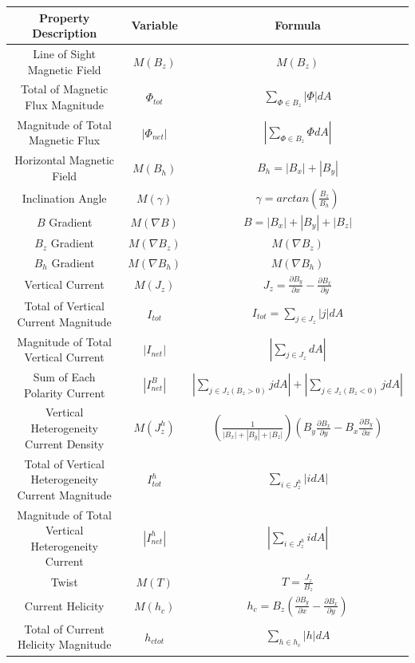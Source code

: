\documentclass[defaultstyle,11pt]{thesis}
\begin{document}
\begin{table}[p!]
\centering
\begin{tabular}{||c c c||} 
 \hline
 Property Description & Variable & Formula \\ 
 \hline\hline
 Line of Sight Magnetic Field & $M(B_z)$ & $M(B_z)$\\ 
 \hline
 Total of Magnetic Flux Magnitude & $\Phi_{tot}$ & $\sum_{\Phi \in B_z}|\Phi|dA$ \\
 \hline
 Magnitude of Total Magnetic Flux & $|\Phi_{net}|$ & $|\sum_{\Phi \in B_z}\Phi dA|$ \\
 \hline
 Horizontal Magnetic Field & $M(B_h)$ & $B_h = |B_x| + |B_y|$ \\
 \hline 
 Inclination Angle & $M(\gamma)$ & $\gamma = arctan(\frac{B_z}{B_h})$ \\
 \hline
 $B$ Gradient & $M(\nabla B)$ & $B = |B_x| + |B_y| + |B_z|$ \\
 \hline
 $B_z$ Gradient & $M(\nabla B_z)$ & $M(\nabla B_z)$ \\
 \hline
 $B_h$ Gradient & $M(\nabla B_h)$ & $M(\nabla B_h)$ \\
 \hline
 Vertical Current & $M(J_z)$ & $J_z = \frac{\partial B_y}{\partial x} - \frac{\partial B_x}{\partial y}$ \\
 \hline
 Total of Vertical Current Magnitude & $I_{tot}$ & $I_{tot} = \sum_{j \in J_z}|j|dA$ \\
 \hline
 Magnitude of Total Vertical Current & $|I_{net}|$ & $|\sum_{j \in J_z}dA|$\\
 \hline
 Sum of Each Polarity Current & $|I_{net}^B|$ & $|\sum_{j \in J_z(B_z > 0)}jdA| + |\sum_{j \in J_z(B_z < 0)}j dA|$ \\
 \hline 
 Vertical Heterogeneity Current Density & $M(J_z^h)$ & $(\frac{1}{|B_x| + |B_y| + |B_z|})(B_y \frac{\partial B_x}{\partial y} - B_x \frac{\partial B_y}{\partial x})$\\
 \hline 
 Total of Vertical Heterogeneity Current Magnitude & $I_{tot}^h$ & $\sum_{i \in J_z^h}|idA|$ \\
 \hline
 Magnitude of Total Vertical Heterogeneity Current & $|I_{net}^h|$ & $|\sum_{i \in J_z^h}idA|$ \\
 \hline
 Twist & $M(T)$ & $T = \frac{J_z}{B_z}$ \\
 \hline
 Current Helicity & $M(h_c)$ & $h_c = B_z(\frac{\partial B_y}{\partial x} - \frac{\partial B_x}{\partial y})$ \\
 \hline
 Total of Current Helicity Magnitude & $h_{c tot}$ & $\sum_{h \in h_c}|h|dA$ \\

\end{tabular}
\end{table}
\end{document}
